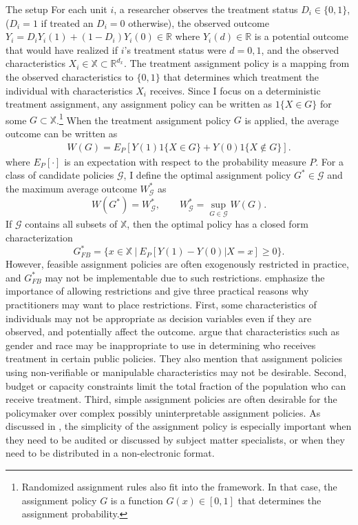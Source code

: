 \documentclass[12pt,oneside,reqno,english]{amsart}
\makeatletter
\renewcommand\subsection{\@startsection{subsection}{2}%
  \z@{-.5\linespacing\@plus-.7\linespacing}{.5\linespacing}%
  {\normalfont\scshape}}
\theoremstyle{definition}
\makeatother
\begin{document}
\subsection{The setup}
For each unit $i$, a researcher observes 
the treatment status $D_{i}\in \{0,1\}$, ($D_{i}=1$ if treated an $D_{i}=0$ otherwise),  the observed outcome $Y_{i}=D_{i}Y_{i}(1)+(1-D_{i})Y_{i}(0)\in \mathbb{R}$ where $Y_{i}(d)\in \mathbb{R}$ is a potential outcome that would have realized if $i$'s treatment status were $d = 0,1$, and the observed characteristics $X_{i}\in \mathbb{X}\subset \mathbb{R}^{d_{x}}$. 
The treatment assignment policy is a mapping from the observed characteristics to $\{0,1\}$ that determines which treatment the individual with characteristics $X_{i}$ 
receives. Since I focus on a deterministic treatment assignment, any assignment policy can be written as $1\{X\in G\}$ for some $G\subset \mathbb{X}$.\footnote{Randomized assignment rules also fit into the framework. In that case, the assignment policy $G$ is a function $G(x)\in [0,1]$ that determines the assignment probability.}
When the treatment assignment policy $G$ is applied, the average outcome can be written as  
\begin{align}
W(G)=E_{P}[Y(1)1\{X\in G\}+Y(0)1\{X\not\in G\}].\label{eq:averageoutcom}
\end{align}
where $E_{P}[\cdot]$ is an expectation with respect to the probability measure $P$.
For a class of candidate policies $\mathcal{G}$, I define the optimal assignment policy $G^{*}\in \mathcal{G}$ and 
the maximum average outcome $W^{*}_{\mathcal{G}}$ as
\[W(G^{*})=W^{*}_{\mathcal{G}},\qquad W^{*}_{\mathcal{G}}=\sup_{G\in \mathcal{G}}W(G).\]
If $\mathcal{G}$ contains all subsets of $\mathbb{X}$, then the optimal policy has a closed form characterization 
\[G^{*}_{FB}=\{x\in \mathbb{X}\ | \ E_{P}[Y(1)-Y(0)|X=x]\geq 0\}.\]
However, feasible assignment policies are often exogenously restricted in practice, and $G^{*}_{FB}$ may not be implementable due to such restrictions. 
\cite{KT:18} emphasize the importance of allowing restrictions and
 give three practical reasons why practitioners may want to place restrictions. 
First, some characteristics of individuals may not be appropriate as decision variables even if they are observed, and potentially affect the outcome. 
\cite{KT:18} argue that characteristics such as gender and race may be inappropriate to use in determining who receives treatment 
in certain public policies. They also mention that assignment policies using non-verifiable or manipulable characteristics may not be desirable.
Second, budget or capacity constraints limit the total fraction of the population who can receive treatment.
Third, simple assignment policies are often desirable for the policymaker over complex possibly uninterpretable assignment policies. 
As discussed in \cite{AW:17}, the simplicity of the assignment policy is especially important when they need to be audited or discussed by subject matter specialists, or when they need to be distributed in a non-electronic format.
\end{document}
